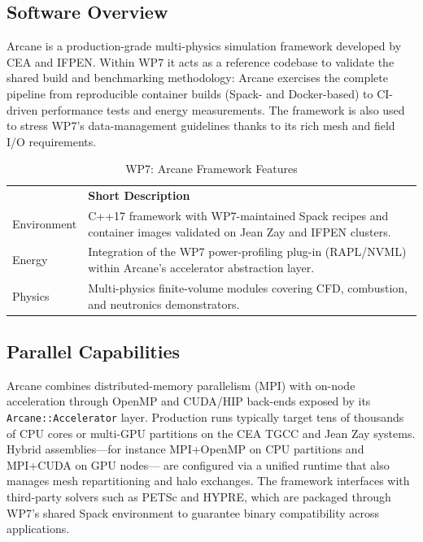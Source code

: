 \subsection{Software Overview}
\label{sec:WP7:Arcane Framework:summary}

Arcane is a production-grade multi-physics simulation framework developed by CEA and IFPEN. Within WP7 it acts as a reference
codebase to validate the shared build and benchmarking methodology: Arcane exercises the complete pipeline from reproducible
container builds (Spack- and Docker-based) to CI-driven performance tests and energy measurements. The framework is also used
to stress WP7's data-management guidelines thanks to its rich mesh and field I/O requirements.

\begin{table}[h!]
    \centering
    { 
        \setlength{\parindent}{0pt}
        \def\arraystretch{1.25}
        {
            \fontsize{9}{11}\selectfont
            \begin{tabular}{!{\color{numpexgray}\vrule}p{.25\linewidth}!{\color{numpexgray}\vrule}p{.6885\linewidth}!{\color{numpexgray}\vrule}}
    
     &  {\rule{0pt}{2.5ex}\color{white}\bf Short Description }\\ 
    
    Environment & C++17 framework with WP7-maintained Spack recipes and container images validated on Jean Zay and IFPEN clusters. \\
    Energy & Integration of the WP7 power-profiling plug-in (RAPL/NVML) within Arcane's accelerator abstraction layer. \\
    Physics & Multi-physics finite-volume modules covering CFD, combustion, and neutronics demonstrators. \\
\end{tabular}
        }
    }
    \caption{WP7: Arcane Framework Features}
\end{table}


\subsection{Parallel Capabilities}
\label{sec:WP7:Arcane Framework:performances}


Arcane combines distributed-memory parallelism (MPI) with on-node acceleration through OpenMP and CUDA/HIP back-ends exposed by
its \texttt{Arcane::Accelerator} layer. Production runs typically target tens of thousands of CPU cores or multi-GPU partitions
on the CEA TGCC and Jean Zay systems. Hybrid assemblies---for instance MPI+OpenMP on CPU partitions and MPI+CUDA on GPU nodes---
are configured via a unified runtime that also manages mesh repartitioning and halo exchanges. The framework interfaces with
third-party solvers such as PETSc and HYPRE, which are packaged through WP7's shared Spack environment to guarantee binary
compatibility across applications.


